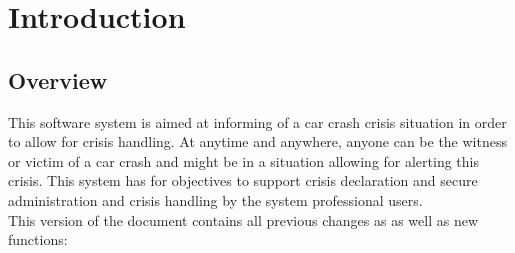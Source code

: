 \chapter{Introduction}
\label{chap:introduction}


\section{Overview}
This software system is aimed at informing of a car crash crisis situation in
order to allow for crisis handling. At anytime and anywhere, anyone can be the
witness or victim of a car crash and might be in a situation allowing for
alerting this crisis. This system has for objectives to support crisis
declaration and secure administration and crisis handling by the system
professional users.\\
This version of the document contains all previous changes as as well as new
functions:
